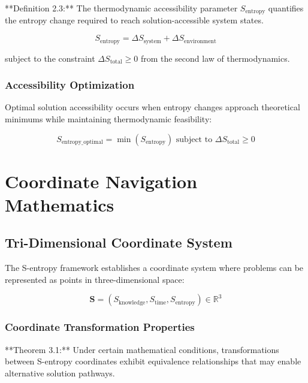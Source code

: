 \documentclass[12pt,a4paper]{article}
\begin{document}
**Definition 2.3:** The thermodynamic accessibility parameter $S_{\text{entropy}}$ quantifies the entropy change required to reach solution-accessible system states.

\begin{equation}
S_{\text{entropy}} = \Delta S_{\text{system}} + \Delta S_{\text{environment}}
\label{eq:thermodynamic_accessibility}
\end{equation}

subject to the constraint $\Delta S_{\text{total}} \geq 0$ from the second law of thermodynamics.

\subsubsection{Accessibility Optimization}

Optimal solution accessibility occurs when entropy changes approach theoretical minimums while maintaining thermodynamic feasibility:

\begin{equation}
S_{\text{entropy\_optimal}} = \min\left(S_{\text{entropy}}\right) \text{ subject to } \Delta S_{\text{total}} \geq 0
\label{eq:entropy_optimization}
\end{equation}

\section{Coordinate Navigation Mathematics}

\subsection{Tri-Dimensional Coordinate System}

The S-entropy framework establishes a coordinate system where problems can be represented as points in three-dimensional space:

\begin{equation}
\mathbf{S} = (S_{\text{knowledge}}, S_{\text{time}}, S_{\text{entropy}}) \in \mathbb{R}^3
\label{eq:tri_dimensional_coordinates}
\end{equation}

\subsubsection{Coordinate Transformation Properties}

**Theorem 3.1:** Under certain mathematical conditions, transformations between S-entropy coordinates exhibit equivalence relationships that may enable alternative solution pathways.
\end{document}
